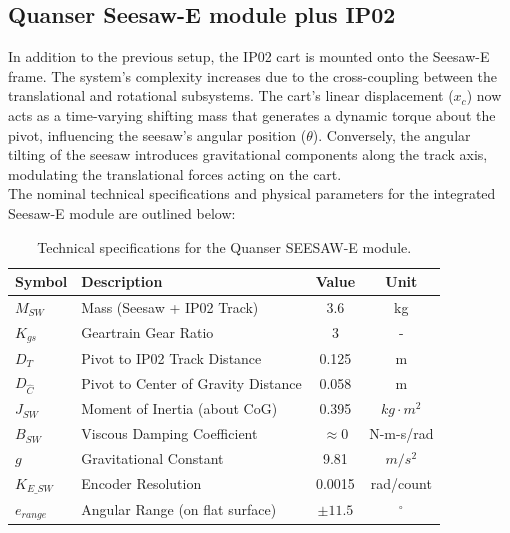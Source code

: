 \documentclass[11pt,a4paper]{article}
\begin{document}
\subsection{Quanser Seesaw-E module plus IP02}\label{sub:seesaw_setup}
In addition to the previous setup, the IP02 cart is mounted onto the Seesaw-E frame. The system's complexity increases due to the cross-coupling between the translational and rotational subsystems. The cart's linear displacement ($x_c$) now acts as a time-varying shifting mass that generates a dynamic torque about the pivot, influencing the seesaw’s angular position ($\theta$). Conversely, the angular tilting of the seesaw introduces gravitational components along the track axis, modulating the translational forces acting on the cart.\\
The nominal technical specifications and physical parameters for the integrated Seesaw-E module are outlined below:
\begin{table}[H]
\caption*{\textbf{SEESAW-E System Specifications}}
\centering
\begin{tabular}{|p{5em} l c c |}
\hline
\rowcolor{bluePoli!40}
\textbf{Symbol} & \textbf{Description} & \textbf{Value} & \textbf{Unit} \T\B \\
\hline \hline
$M_{SW}$ & Mass (Seesaw + IP02 Track) & 3.6 & kg \T\B \\
$K_{gs}$ & Geartrain Gear Ratio & 3 & - \T\B \\
$D_{T}$ & Pivot to IP02 Track Distance & 0.125 & m \T\B \\
$D_{\hat{C}}$ & Pivot to Center of Gravity Distance & 0.058 & m \T\B \\
$J_{SW}$ & Moment of Inertia (about CoG) & 0.395 & $kg \cdot m^2$ \T\B \\
$B_{SW}$ & Viscous Damping Coefficient & $\approx 0$ & N-m-s/rad \T\B \\
$g$ & Gravitational Constant & 9.81 & $m/s^2$ \T\B \\
$K_{E\_SW}$ & Encoder Resolution & 0.0015 & rad/count \T\B \\
$e_{range}$ & Angular Range (on flat surface) & $\pm 11.5$ & $^\circ$ \B \\
\hline
\end{tabular}
\caption{Technical specifications for the Quanser SEESAW-E module.}
\label{table:seesaw_specs}
\end{table}
\end{document}
